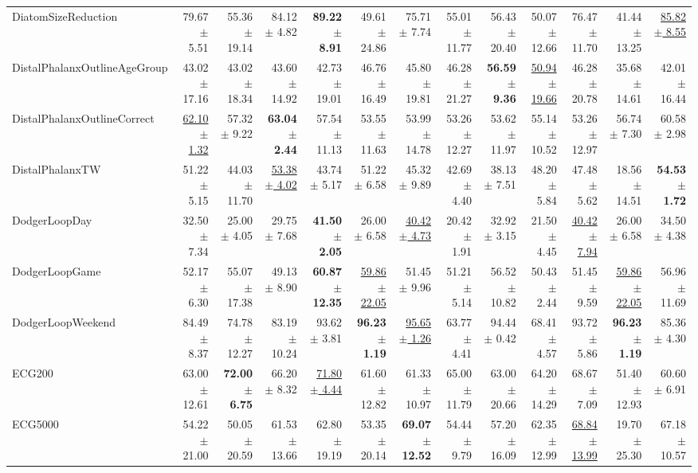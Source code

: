 \begin{landscape}
\begin{longtable}{lrrrrrrrrrrrr}
DiatomSizeReduction & 79.67 $\pm$ 5.51 & 55.36 $\pm$ 19.14 & 84.12 $\pm$ 4.82 & \textbf{89.22 $\pm$ 8.91} & 49.61 $\pm$ 24.86 & 75.71 $\pm$ 7.74 & 55.01 $\pm$ 11.77 & 56.43 $\pm$ 20.40 & 50.07 $\pm$ 12.66 & 76.47 $\pm$ 11.70 & 41.44 $\pm$ 13.25 & \underline{85.82 $\pm$ 8.55} \\
DistalPhalanxOutlineAgeGroup & 43.02 $\pm$ 17.16 & 43.02 $\pm$ 18.34 & 43.60 $\pm$ 14.92 & 42.73 $\pm$ 19.01 & 46.76 $\pm$ 16.49 & 45.80 $\pm$ 19.81 & 46.28 $\pm$ 21.27 & \textbf{56.59 $\pm$ 9.36} & \underline{50.94 $\pm$ 19.66} & 46.28 $\pm$ 20.78 & 35.68 $\pm$ 14.61 & 42.01 $\pm$ 16.44 \\
DistalPhalanxOutlineCorrect & \underline{62.10 $\pm$ 1.32} & 57.32 $\pm$ 9.22 & \textbf{63.04 $\pm$ 2.44} & 57.54 $\pm$ 11.13 & 53.55 $\pm$ 11.63 & 53.99 $\pm$ 14.78 & 53.26 $\pm$ 12.27 & 53.62 $\pm$ 11.97 & 55.14 $\pm$ 10.52 & 53.26 $\pm$ 12.97 & 56.74 $\pm$ 7.30 & 60.58 $\pm$ 2.98 \\
DistalPhalanxTW & 51.22 $\pm$ 5.15 & 44.03 $\pm$ 11.70 & \underline{53.38 $\pm$ 4.02} & 43.74 $\pm$ 5.17 & 51.22 $\pm$ 6.58 & 45.32 $\pm$ 9.89 & 42.69 $\pm$ 4.40 & 38.13 $\pm$ 7.51 & 48.20 $\pm$ 5.84 & 47.48 $\pm$ 5.62 & 18.56 $\pm$ 14.51 & \textbf{54.53 $\pm$ 1.72} \\
DodgerLoopDay & 32.50 $\pm$ 7.34 & 25.00 $\pm$ 4.05 & 29.75 $\pm$ 7.68 & \textbf{41.50 $\pm$ 2.05} & 26.00 $\pm$ 6.58 & \underline{40.42 $\pm$ 4.73} & 20.42 $\pm$ 1.91 & 32.92 $\pm$ 3.15 & 21.50 $\pm$ 4.45 & \underline{40.42 $\pm$ 7.94} & 26.00 $\pm$ 6.58 & 34.50 $\pm$ 4.38 \\
DodgerLoopGame & 52.17 $\pm$ 6.30 & 55.07 $\pm$ 17.38 & 49.13 $\pm$ 8.90 & \textbf{60.87 $\pm$ 12.35} & \underline{59.86 $\pm$ 22.05} & 51.45 $\pm$ 9.96 & 51.21 $\pm$ 5.14 & 56.52 $\pm$ 10.82 & 50.43 $\pm$ 2.44 & 51.45 $\pm$ 9.59 & \underline{59.86 $\pm$ 22.05} & 56.96 $\pm$ 11.69 \\
DodgerLoopWeekend & 84.49 $\pm$ 8.37 & 74.78 $\pm$ 12.27 & 83.19 $\pm$ 10.24 & 93.62 $\pm$ 3.81 & \textbf{96.23 $\pm$ 1.19} & \underline{95.65 $\pm$ 1.26} & 63.77 $\pm$ 4.41 & 94.44 $\pm$ 0.42 & 68.41 $\pm$ 4.57 & 93.72 $\pm$ 5.86 & \textbf{96.23 $\pm$ 1.19} & 85.36 $\pm$ 4.30 \\
ECG200 & 63.00 $\pm$ 12.61 & \textbf{72.00 $\pm$ 6.75} & 66.20 $\pm$ 8.32 & \underline{71.80 $\pm$ 4.44} & 61.60 $\pm$ 12.82 & 61.33 $\pm$ 10.97 & 65.00 $\pm$ 11.79 & 63.00 $\pm$ 20.66 & 64.20 $\pm$ 14.29 & 68.67 $\pm$ 7.09 & 51.40 $\pm$ 12.93 & 60.60 $\pm$ 6.91 \\
ECG5000 & 54.22 $\pm$ 21.00 & 50.05 $\pm$ 20.59 & 61.53 $\pm$ 13.66 & 62.80 $\pm$ 19.19 & 53.35 $\pm$ 20.14 & \textbf{69.07 $\pm$ 12.52} & 54.44 $\pm$ 9.79 & 57.20 $\pm$ 16.09 & 62.35 $\pm$ 12.99 & \underline{68.84 $\pm$ 13.99} & 19.70 $\pm$ 25.30 & 67.18 $\pm$ 10.57 \\

\end{longtable}
\end{landscape}
